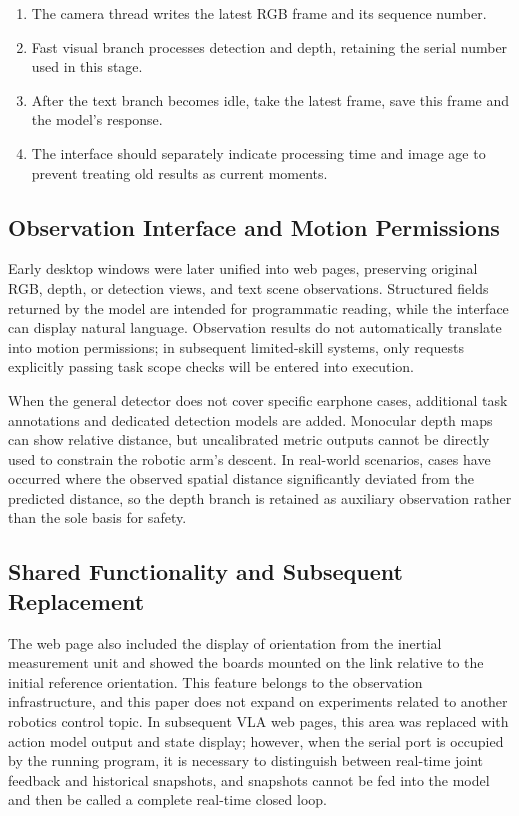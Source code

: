 \begin{enumerate}
\def\labelenumi{\arabic{enumi}.}
\tightlist
\item
  The camera thread writes the latest RGB frame and its sequence number.
\item
  Fast visual branch processes detection and depth, retaining the serial number used in this stage.
\item
  After the text branch becomes idle, take the latest frame, save this frame and the model's response.
\item
  The interface should separately indicate processing time and image age to prevent treating old results as current moments.
\end{enumerate}

\subsection{Observation Interface and Motion Permissions}\label{s02-detail-2}

Early desktop windows were later unified into web pages, preserving original RGB, depth, or detection views, and text scene observations. Structured fields returned by the model are intended for programmatic reading, while the interface can display natural language. Observation results do not automatically translate into motion permissions; in subsequent limited-skill systems, only requests explicitly passing task scope checks will be entered into execution.

When the general detector does not cover specific earphone cases, additional task annotations and dedicated detection models are added. Monocular depth maps can show relative distance, but uncalibrated metric outputs cannot be directly used to constrain the robotic arm's descent. In real-world scenarios, cases have occurred where the observed spatial distance significantly deviated from the predicted distance, so the depth branch is retained as auxiliary observation rather than the sole basis for safety.

\subsection{Shared Functionality and Subsequent Replacement}\label{s02-detail-3}

The web page also included the display of orientation from the inertial measurement unit and showed the boards mounted on the link relative to the initial reference orientation. This feature belongs to the observation infrastructure, and this paper does not expand on experiments related to another robotics control topic. In subsequent VLA web pages, this area was replaced with action model output and state display; however, when the serial port is occupied by the running program, it is necessary to distinguish between real-time joint feedback and historical snapshots, and snapshots cannot be fed into the model and then be called a complete real-time closed loop.


